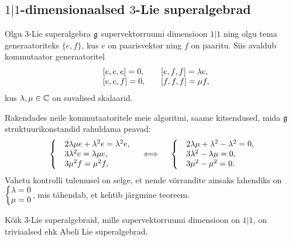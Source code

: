 
\subsection{\texorpdfstring{$1|1$}{1|1}-dimensionaalsed
    \texorpdfstring{$3$}{3}-Lie superalgebrad}

Olgu $3$-Lie superalgebra $\mathfrak{g}$ supervektorruumi dimensioon
$1|1$ ning olgu tema generaatoriteks $\{ e, f \}$, kus $e$ on paarisvektor
ning $f$ on paaritu. Siis avaldub kommutaator generaatoritel
\begin{align*}
    \begin{matrix*}[l]
        &[e, e, e] = 0,\quad
        &[e, f, f] = \l e, \\
        &[e, e, f] = 0,\quad
        &[f, f, f] = \m f,
    \end{matrix*}
\end{align*}
kus $\lambda, \mu \in \mathbb{C}$ on suvalised skalaarid.

Rakendades neile kommutaatoritele meie algoritmi, saame kitsendused,
mida $\mathfrak{g}$ struktuurikonstandid rahuldama peavad:
\begin{align*}
    \left\{
        \begin{matrix*}[l]
            &2\l\m e + \l^2 e =  \l^2 e, \\
            &3\l^2 e = \l\m e, \\
            &3\m^2 f = \m^2 f,
        \end{matrix*}
    \right.
    \quad \iff \quad
    \left\{
        \begin{matrix*}[l]
            &2\l\m + \l^2 - \l^2 = 0, \\
            &3\l^2 - \l\m = 0, \\
            &3\m^2 - \m^2 = 0.
        \end{matrix*}
    \right.
\end{align*}
Vahetu kontrolli tulemusel on selge, et nende võrrandite ainsaks lahendiks on
$\left\{ \begin{matrix} \lambda = 0 \\ \mu = 0 \end{matrix} \right.$,
mis tähendab, et kehtib järgmine teoreem.

\begin{thm}
    Kõik $3$-Lie superalgebraid, mille supervektorruumi dimensioon on $1|1$,
    on triviaalsed ehk Abeli Lie superalgebrad.
\end{thm}
